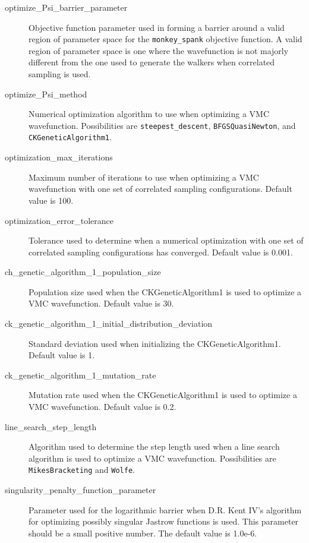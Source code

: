 \documentclass[11pt]{article}
\begin{document}
\begin{description}
\item [optimize\_Psi\_barrier\_parameter] Objective function
  parameter used in forming a barrier around a valid region of
  parameter space for the \verb-monkey_spank- objective function.  A
  valid region of parameter space is one where the wavefunction is not
  majorly different from the one used to generate the walkers when
  correlated sampling is used. 

\item [optimize\_Psi\_method] Numerical optimization algorithm to
  use when optimizing a VMC wavefunction.  Possibilities are
  \verb-steepest_descent-, \verb-BFGSQuasiNewton-, and
  \verb-CKGeneticAlgorithm1-. 

\item [optimization\_max\_iterations] Maximum number of iterations
  to use when optimizing a VMC wavefunction with one set of correlated
  sampling configurations.  Default value is 100.

\item [optimization\_error\_tolerance] Tolerance used to determine
  when a numerical optimization with one set of correlated sampling
  configurations has converged.  Default value is 0.001.

\item [ch\_genetic\_algorithm\_1\_population\_size] Population size
  used when the CKGeneticAlgorithm1 is used to optimize a VMC
  wavefunction.  Default value is 30.

\item [ck\_genetic\_algorithm\_1\_initial\_distribution\_deviation]
  Standard deviation used when initializing the CKGeneticAlgorithm1.
  Default value is 1.

\item [ck\_genetic\_algorithm\_1\_mutation\_rate] Mutation rate used
  when the CKGeneticAlgorithm1 is used to optimize a VMC
  wavefunction.  Default value is 0.2.  
 
\item [line\_search\_step\_length] Algorithm used to determine the
  step length used when a line search algorithm is used to optimize a
  VMC wavefunction.  Possibilities are \verb-MikesBracketing- and
  \verb-Wolfe-.

\item [singularity\_penalty\_function\_parameter] Parameter used
  for the logarithmic barrier when D.R. Kent IV's algorithm for
  optimizing possibly singular Jastrow functions is used.  This
  parameter should be a small positive number.  The default value is
  1.0e-6.

\end{description}
\end{document}
